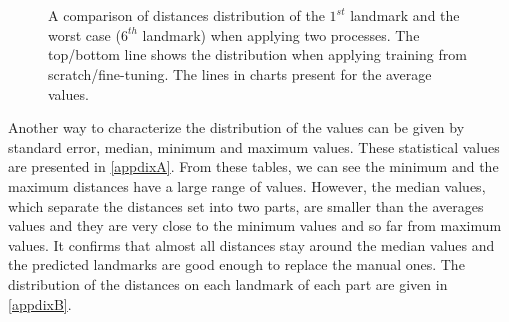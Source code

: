 \documentclass[review]{elsarticle}
\begin{document}
\begin{figure}[htbp]
    \centering
    ~~
    \\
    ~~
    \caption{A comparison of distances distribution of the $1^{st}$ landmark and the worst case ($6^{th}$ landmark) when applying two processes. The top/bottom line shows the distribution when applying training from scratch/fine-tuning.  The lines in charts present for the average values.}
    \label{figchartfn}
\end{figure}

Another way to characterize the distribution of the values can be
given by standard error, median, minimum and maximum values. These
statistical values are presented in \ref{appdixA}. From these tables,
we can see the minimum and the maximum distances have a large range of
values. However, the median values, which separate the distances set
into two parts, are smaller than the averages values and they are very
close to the minimum values and so far from maximum values. It
confirms that almost all distances stay around the median values and
the predicted landmarks are good enough to replace the manual
ones. The distribution of the distances on each landmark of
each part are given in \ref{appdixB}.
\end{document}
